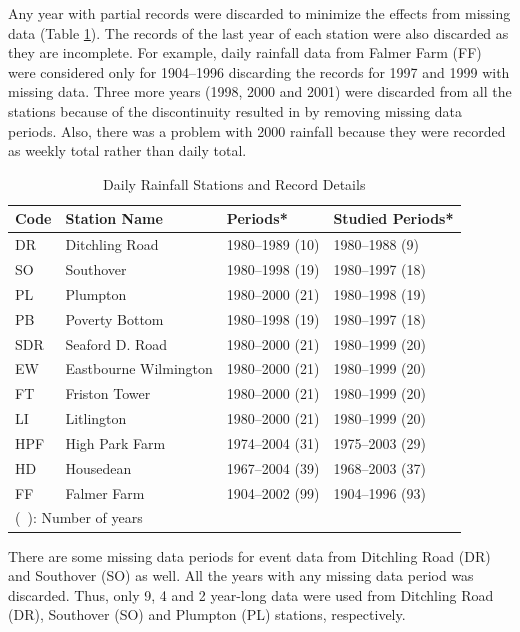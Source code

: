 Any year with partial records were discarded to minimize the effects from
missing data (Table \ref{tab:DailyRainfallStationsAndRecordDetails}).
The records of the last year of each station were also discarded as they are
incomplete. For example, daily rainfall data from Falmer Farm (FF) were
considered only for 1904--1996 discarding the records for 1997 and 1999 with
missing data. Three more years (1998, 2000 and 2001) were discarded from all the
stations because of the discontinuity resulted in by removing missing data
periods. Also, there was a problem with 2000 rainfall because they were recorded
as weekly total rather than daily total.

\begin{table}[htbp]
  \centering
  \caption{Daily Rainfall Stations and Record Details }
  \label{tab:DailyRainfallStationsAndRecordDetails}
  \small
    \begin{tabular}{llll} \toprule
    \textbf{Code} & \textbf{Station Name} & \textbf{Periods}* &
\textbf{Studied Periods}*\\
    \midrule
    DR & Ditchling Road & 1980--1989 (10) & 1980--1988 (9)\\
    SO & Southover & 1980--1998 (19) & 1980--1997 (18)\\
    PL & Plumpton & 1980--2000 (21) & 1980--1998 (19)\\
    PB & Poverty Bottom & 1980--1998 (19) & 1980--1997 (18)\\
    SDR & Seaford D. Road & 1980--2000 (21) & 1980--1999 (20)\\
    EW & Eastbourne Wilmington & 1980--2000 (21) & 1980--1999 (20)\\
    FT & Friston Tower & 1980--2000 (21) & 1980--1999 (20)\\
    LI & Litlington & 1980--2000 (21) & 1980--1999 (20)\\
    HPF & High Park Farm & 1974--2004 (31) & 1975--2003 (29)\\
    HD & Housedean & 1967--2004 (39) & 1968--2003 (37)\\
    FF & Falmer Farm & 1904--2002 (99) & 1904--1996 (93)\\
    \bottomrule
    \multicolumn{4}{l}{\footnotesize * (\ ): Number of years}
    \end{tabular}
\end{table}

There are some missing data periods for event data from Ditchling Road (DR) and
Southover (SO) as well. All the years with any missing data period was
discarded. Thus, only 9, 4 and 2 year-long data were used from Ditchling Road
(DR), Southover (SO) and Plumpton (PL) stations, respectively.

